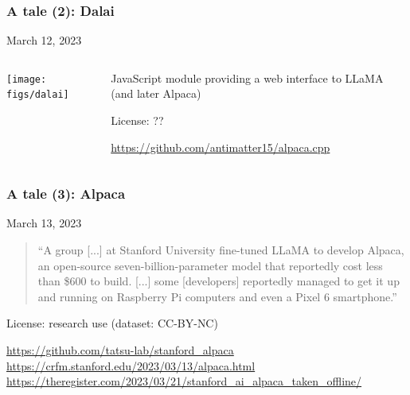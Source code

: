 \documentclass[17pt,aspectratio=169,hyperref={pdfusetitle,colorlinks,allcolors=olive}]{beamer}
\begin{document}
\begin{frame}[fragile]
  \frametitle{A tale (2): Dalai}

  March 12, 2023
  
  \begin{columns}[T]
    \begin{column}{.58\textwidth}
      \texttt{[image: figs/dalai]}
    \end{column}%
    \hfill%
    \begin{column}{.38\textwidth}
      \vspace{1.5cm}

      
      JavaScript module providing a web interface to LLaMA (and later Alpaca)

      License: ??
      
      {\scriptsize
        \url{https://github.com/antimatter15/alpaca.cpp}
      }
    \end{column}%
  \end{columns}


\end{frame}

\begin{frame}[fragile]
  \frametitle{A tale (3): Alpaca}

  March 13, 2023
  
  \begin{quote}
    \footnotesize ``A group [...] at Stanford University fine-tuned LLaMA to develop Alpaca, an open-source seven-billion-parameter model that reportedly cost less than \$600 to build. [...] some [developers] reportedly managed to get it up and running on Raspberry Pi computers and even a Pixel 6 smartphone.''
  \end{quote}

  License: research use (dataset: CC-BY-NC)
  
  \begin{flushright}
    {\scriptsize
      \url{https://github.com/tatsu-lab/stanford_alpaca} \\
      \url{https://crfm.stanford.edu/2023/03/13/alpaca.html} \\
      \url{https://theregister.com/2023/03/21/stanford_ai_alpaca_taken_offline/} \\
    }
  \end{flushright}
\end{frame}
\end{document}
